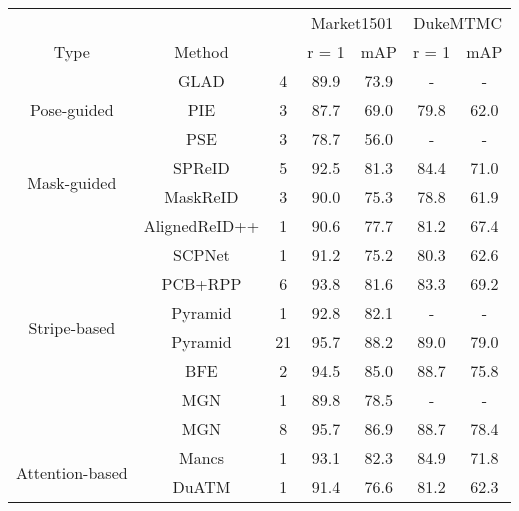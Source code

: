 \documentclass[journal]{IEEEtran}
\begin{document}
\renewcommand{\multirowsetup}{\centering}
\begin{table}[tb]\footnotesize
  \begin{center}
  \begin{tabular}{ ccc|cc|cc}
\hline
    		&		&       & \multicolumn{2}{c|}{Market1501} & \multicolumn{2}{c}{DukeMTMC}	 \\
  Type   & Method & 	   & r = 1 	& mAP	&r = 1 	& mAP 	 \\
 	\hline
	\hline
    \multirow{3}{1cm}{Pose-guided}& GLAD\cite{wei2017glad}        & 4  &89.9	&73.9	&-	&-		\\
                                & PIE \cite{zheng2019pose}          & 3  &87.7	&69.0	&79.8	&62.0		\\
                                & PSE \cite{Sarfraz_2018_CVPR}      & 3  &78.7	&56.0	&-	&-		\\
    \hline
    \multirow{2}{1cm}{Mask-guided}& SPReID \cite{kalayeh2018human}    & 5  & 92.5 & 81.3	& 84.4	&71.0		\\
                                & MaskReID \cite{qi2018maskreid}    & 3  &90.0	&75.3	&78.8	&61.9		\\
 \hline
    \multirow{8}{1cm}{Stripe-based}& AlignedReID++ \cite{LUO2019}& 1 &90.6 &77.7 &81.2	&67.4 		\\
                                & SCPNet \cite{fan2018scpnet}       & 1  & 91.2	&75.2	&80.3	&62.6		\\
                                & PCB+RPP \cite{sun2018beyond}      & 6  & 93.8	&81.6	&83.3	&69.2		\\
                                & Pyramid\cite{zheng2018coarse}     & 1 & 92.8 &82.1	&-	&-		\\
                                & Pyramid\cite{zheng2018coarse}     & 21 & 95.7 &88.2	&89.0	&79.0		\\
                                & BFE\cite{dai2018batch}            & 2 & 94.5 &85.0	&88.7	&75.8		\\
                                & MGN \cite{wang2018learning}       & 1 & 89.8 &78.5	&-	&-		\\
                                & MGN \cite{wang2018learning}       & 8 & 95.7 &86.9	&88.7	&78.4		\\
   \hline
    \multirow{3}{1cm}{Attention-based}& Mancs \cite{wang2018mancs}        & 1 &93.1   &82.3	&84.9	&71.8		\\
                                & DuATM \cite{si2018dual}           & 1 & 91.4	& 76.6	&81.2	&62.3		\\

\end{tabular}
\end{center}
\end{table}
\end{document}
